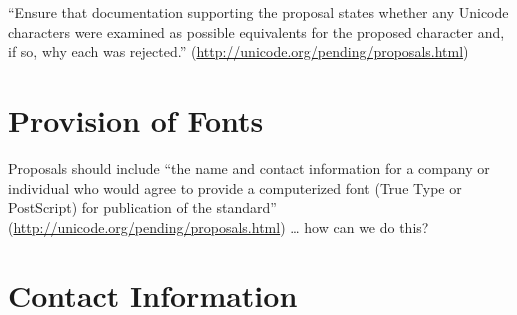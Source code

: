 \documentclass[10pt,english]{article}
\begin{document}
``Ensure that documentation supporting the proposal states whether
any Unicode characters were examined as possible equivalents for the
proposed character and, if so, why each was rejected.'' (\url{http://unicode.org/pending/proposals.html})


\section{Provision of Fonts}

Proposals should include ``the name and contact information
for a company or individual who would agree to provide a computerized
font (True Type or PostScript) for publication of the standard''
(\url{http://unicode.org/pending/proposals.html})
\dots{} how can we do this?


\section{Contact Information}
\end{document}
